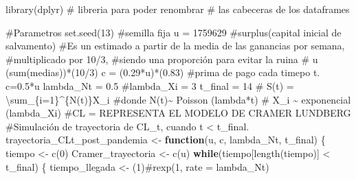 \documentclass[
  us-letterpaper,
]{scrreprt}
\newenvironment{Shaded}{\begin{snugshade}}{\end{snugshade}}
\newcommand{\CommentTok}[1]{\textcolor[rgb]{0.37,0.37,0.37}{#1}}
\newcommand{\ControlFlowTok}[1]{\textcolor[rgb]{0.00,0.23,0.31}{\textbf{#1}}}
\newcommand{\DecValTok}[1]{\textcolor[rgb]{0.68,0.00,0.00}{#1}}
\newcommand{\FloatTok}[1]{\textcolor[rgb]{0.68,0.00,0.00}{#1}}
\newcommand{\FunctionTok}[1]{\textcolor[rgb]{0.28,0.35,0.67}{#1}}
\newcommand{\NormalTok}[1]{\textcolor[rgb]{0.00,0.23,0.31}{#1}}
\newcommand{\OtherTok}[1]{\textcolor[rgb]{0.00,0.23,0.31}{#1}}
\newcommand{\SpecialCharTok}[1]{\textcolor[rgb]{0.37,0.37,0.37}{#1}}
\theoremstyle{plain}
\theoremstyle{plain}
\theoremstyle{definition}
\theoremstyle{remark}
\begin{document}
\begin{Shaded}
\begin{Highlighting}[]
\FunctionTok{library}\NormalTok{(dplyr) }\CommentTok{\# libreria para poder renombrar }
\CommentTok{\# las cabeceras de los dataframes}

\CommentTok{\#Parametros}
\FunctionTok{set.seed}\NormalTok{(}\DecValTok{13}\NormalTok{) }\CommentTok{\#semilla fija}
\NormalTok{u }\OtherTok{=} \DecValTok{1759629} \CommentTok{\#surplus(capital inicial de salvamento)}
\CommentTok{\#Es un estimado a partir de la media de las ganancias por semana, }
\CommentTok{\#multiplicado por 10/3, }
\CommentTok{\#siendo una proporción para evitar la ruina}
\CommentTok{\# u (sum(medias))*(10/3)}
\NormalTok{c }\OtherTok{=}\NormalTok{ (}\FloatTok{0.29}\SpecialCharTok{*}\NormalTok{u)}\SpecialCharTok{*}\NormalTok{(}\FloatTok{0.83}\NormalTok{) }\CommentTok{\#prima de pago cada timepo t. c=0.5*u}
\NormalTok{lambda\_Nt }\OtherTok{=} \FloatTok{0.5}
\CommentTok{\#lambda\_Xi = 3}
\NormalTok{t\_final }\OtherTok{=} \DecValTok{14}
\CommentTok{\# S(t) = \textbackslash{}sum\_\{i=1\}\^{}\{N(t)\}X\_i}
\CommentTok{\#donde N(t)\textasciitilde{} Poisson (lambda*t)}
\CommentTok{\# X\_i \textasciitilde{} exponencial (lambda\_Xi)}
\CommentTok{\#CL = REPRESENTA EL MODELO DE CRAMER LUNDBERG}
\CommentTok{\#Simulación de trayectoria de CL\_t, cuando t \textless{} t\_final.}
\NormalTok{trayectoria\_CLt\_post\_pandemia }\OtherTok{\textless{}{-}} \ControlFlowTok{function}\NormalTok{(u, c, lambda\_Nt, t\_final)}
\NormalTok{\{}
\NormalTok{  tiempo }\OtherTok{\textless{}{-}} \FunctionTok{c}\NormalTok{(}\DecValTok{0}\NormalTok{)}
\NormalTok{  Cramer\_trayectoria }\OtherTok{\textless{}{-}} \FunctionTok{c}\NormalTok{(u)}
  \ControlFlowTok{while}\NormalTok{(tiempo[}\FunctionTok{length}\NormalTok{(tiempo)] }\SpecialCharTok{\textless{}}\NormalTok{ t\_final)}
\NormalTok{  \{}
\NormalTok{    tiempo\_llegada }\OtherTok{\textless{}{-}}\NormalTok{ (}\DecValTok{1}\NormalTok{)}\CommentTok{\#rexp(1, rate = lambda\_Nt)}
    

\end{Highlighting}
\end{Shaded}
\end{document}
